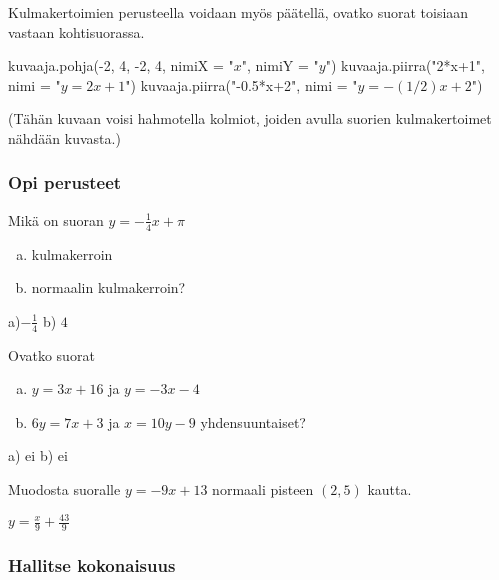 Kulmakertoimien perusteella voidaan myös päätellä, ovatko suorat toisiaan vastaan kohtisuorassa.

\begin{kuva}
    kuvaaja.pohja(-2, 4, -2, 4, nimiX = "$x$", nimiY = "$y$")
    kuvaaja.piirra("2*x+1", nimi = "$y=2x+1$")
    kuvaaja.piirra("-0.5*x+2", nimi = "$y=-(1/2)x+2$")
\end{kuva}

(Tähän kuvaan voisi hahmotella kolmiot, joiden avulla suorien kulmakertoimet nähdään kuvasta.)



\begin{tehtavasivu}

\subsubsection*{Opi perusteet}

\begin {tehtava}
Mikä on suoran $y=-\frac{1}{4}x+\pi$
\begin{enumerate} [a)]
\item kulmakerroin
\item normaalin kulmakerroin?
\end{enumerate}
\begin {vastaus}
a)$-\frac{1}{4}$  b) $4$ 
\end {vastaus}
\end {tehtava}

\begin {tehtava}
Ovatko suorat 
\begin{enumerate} [a)]
\item $y=3x+16$ ja $y=-3x-4$
\item $6y=7x+3$ ja $x=10y-9$ yhdensuuntaiset?
\end{enumerate}
\begin {vastaus}
a) ei b) ei
\end {vastaus}
\end {tehtava}

\begin {tehtava}
Muodosta suoralle $y=-9x+13$ normaali pisteen $(2, 5)$ kautta.
\begin {vastaus}
$y=\frac{x}{9}+\frac{43}{9}$
\end {vastaus}
\end {tehtava}

\subsubsection*{Hallitse kokonaisuus}


\end{tehtavasivu}
